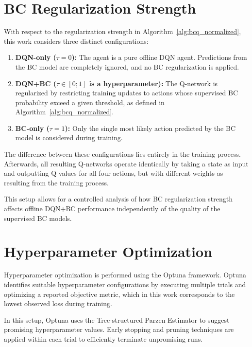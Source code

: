 \section{BC Regularization Strength}
\label{sec:bc_regularization_strength}
With respect to the regularization strength in Algorithm~\ref{alg:bcq_normalized}, this work considers three distinct configurations:

\begin{enumerate}[label=\textbullet]
    \item \textbf{DQN-only ($\tau=0$):} The agent is a pure offline DQN agent. Predictions from the BC model are completely ignored, and no BC regularization is applied.

    \item \textbf{DQN+BC ($\tau \in [0;1]$ is a hyperparameter):} The Q-network is regularized by restricting training updates to actions whose supervised BC probability exceed a given threshold, as defined in  Algorithm~\ref{alg:bcq_normalized}.

    \item \textbf{BC-only ($\tau=1$):} Only the single most likely action predicted by the BC model is considered during training.
\end{enumerate}

The difference between these configurations lies entirely in the training process. Afterwards, all resulting Q-networks operate identically by taking a state as input and outputting Q-values for all four actions, but with different weights as resulting from the training process.

This setup allows for a controlled analysis of how BC regularization strength affects offline DQN+BC performance independently of the quality of the supervised BC models.





\section{Hyperparameter Optimization}
\label{sec:hyperparameter_optimization}

Hyperparameter optimization is performed using the Optuna framework. Optuna identifies suitable hyperparameter configurations by executing multiple trials and optimizing a reported objective metric, which in this work corresponds to the lowest observed loss during training.

In this setup, Optuna uses the Tree-structured Parzen Estimator to suggest promising hyperparameter values. Early stopping and pruning techniques are applied within each trial to efficiently terminate unpromising runs.

